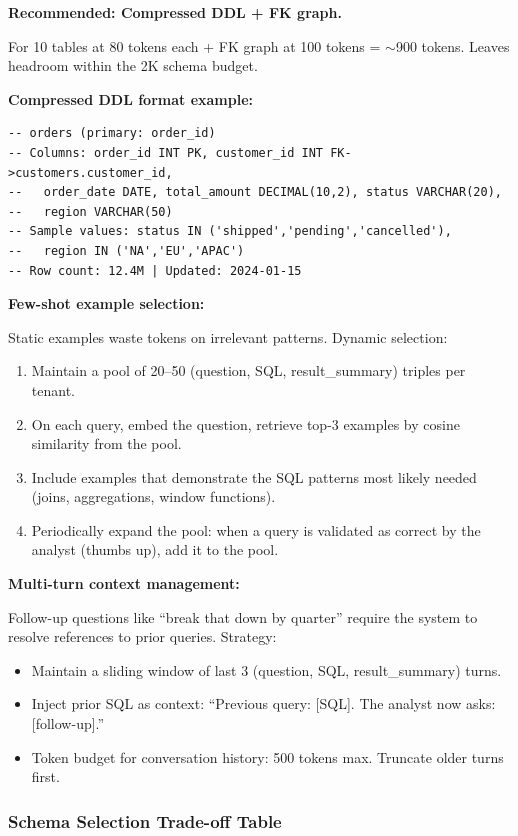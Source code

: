 \textbf{Recommended: Compressed DDL + FK graph.}

For 10 tables at 80 tokens each + FK graph at 100 tokens = $\sim$900 tokens. Leaves headroom within the 2K schema budget.

\textbf{Compressed DDL format example:}

\begin{verbatim}
-- orders (primary: order_id)
-- Columns: order_id INT PK, customer_id INT FK->customers.customer_id,
--   order_date DATE, total_amount DECIMAL(10,2), status VARCHAR(20),
--   region VARCHAR(50)
-- Sample values: status IN ('shipped','pending','cancelled'),
--   region IN ('NA','EU','APAC')
-- Row count: 12.4M | Updated: 2024-01-15
\end{verbatim}

\textbf{Few-shot example selection:}

Static examples waste tokens on irrelevant patterns. Dynamic selection:
\begin{enumerate}
  \item Maintain a pool of 20--50 (question, SQL, result\_summary) triples per tenant.
  \item On each query, embed the question, retrieve top-3 examples by cosine similarity from the pool.
  \item Include examples that demonstrate the SQL patterns most likely needed (joins, aggregations, window functions).
  \item Periodically expand the pool: when a query is validated as correct by the analyst (thumbs up), add it to the pool.
\end{enumerate}

\textbf{Multi-turn context management:}

Follow-up questions like ``break that down by quarter'' require the system to resolve references to prior queries. Strategy:
\begin{itemize}
  \item Maintain a sliding window of last 3 (question, SQL, result\_summary) turns.
  \item Inject prior SQL as context: ``Previous query: [SQL]. The analyst now asks: [follow-up].''
  \item Token budget for conversation history: 500 tokens max. Truncate older turns first.
\end{itemize}

\subsubsection*{Schema Selection Trade-off Table}

